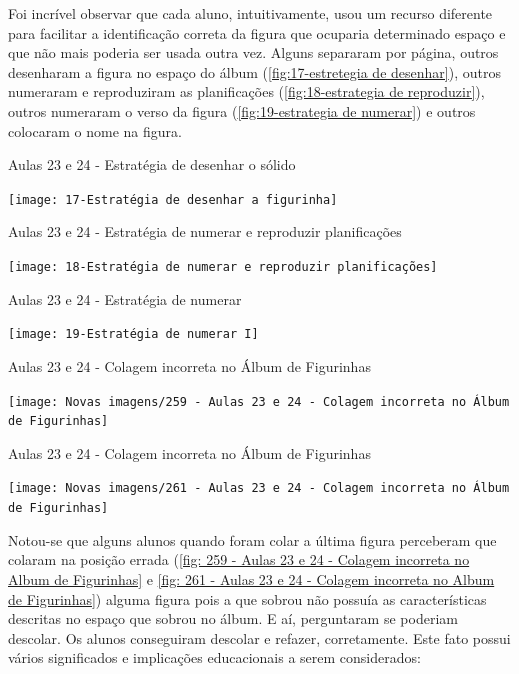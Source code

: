 Foi incrível observar que cada aluno, intuitivamente, usou um recurso diferente para facilitar a identificação correta da figura que ocuparia determinado espaço e que não mais poderia ser usada outra vez. Alguns separaram por página, outros desenharam a figura no espaço do álbum (\autoref{fig:17-estretegia de desenhar}), outros numeraram e reproduziram as planificações (\autoref{fig:18-estrategia de reproduzir}), outros numeraram o verso da figura (\autoref{fig:19-estrategia de numerar}) e outros colocaram o nome na figura.

\begin{CenteredFigure}
    \caption{Aulas 23 e 24 - Estratégia de desenhar o sólido} \label{fig:17-estretegia de desenhar}
    \texttt{[image: 17-Estratégia de desenhar a figurinha]}
    \legend{\autoria}
\end{CenteredFigure}

\begin{CenteredFigure}
    \caption{Aulas 23 e 24 - Estratégia de numerar e reproduzir planificações} \label{fig:18-estrategia de reproduzir}
    \texttt{[image: 18-Estratégia de numerar e reproduzir planificações]}
    \legend{\autoria}
\end{CenteredFigure}

\begin{CenteredFigure}
    \caption{Aulas 23 e 24 - Estratégia de numerar} \label{fig:19-estrategia de numerar}
    \texttt{[image: 19-Estratégia de numerar I]}
    \legend{\autoria}
\end{CenteredFigure}

\begin{CenteredFigure}
    \caption{Aulas 23 e 24 - Colagem incorreta no Álbum de Figurinhas} \label{fig: 259 - Aulas 23 e 24 - Colagem incorreta no Album de Figurinhas}
    \texttt{[image: Novas imagens/259 - Aulas 23 e 24 - Colagem incorreta no Álbum de Figurinhas]}
    \legend{\autoria}
\end{CenteredFigure}

\begin{CenteredFigure}
    \caption{Aulas 23 e 24 - Colagem incorreta no Álbum de Figurinhas} \label{fig: 261 - Aulas 23 e 24 - Colagem incorreta no Album de Figurinhas}
    \texttt{[image: Novas imagens/261 - Aulas 23 e 24 - Colagem incorreta no Álbum de Figurinhas]}
    \legend{\autoria}
\end{CenteredFigure}

Notou-se que alguns alunos quando foram colar a última figura perceberam que colaram na posição errada (\autoref{fig: 259 - Aulas 23 e 24 - Colagem incorreta no Album de Figurinhas} e \autoref{fig: 261 - Aulas 23 e 24 - Colagem incorreta no Album de Figurinhas}) alguma figura pois a que sobrou não possuía as características descritas no espaço que sobrou no álbum. E aí, perguntaram se poderiam descolar. Os alunos conseguiram descolar e refazer, corretamente. Este fato possui vários significados e implicações educacionais a serem considerados:

